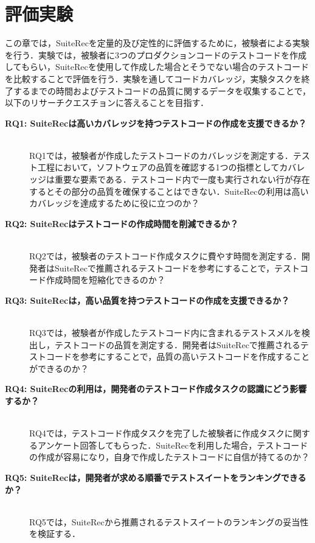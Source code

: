 \documentclass[12pt]{jarticle} %
\begin{document}
\section{評価実験}
この章では，SuiteRecを定量的及び定性的に評価するために，被験者による実験を行う．実験では，被験者に3つのプロダクションコードのテストコードを作成してもらい，SuiteRecを使用して作成した場合とそうでない場合のテストコードを比較することで評価を行う．実験を通してコードカバレッジ，実験タスクを終了するまでの時間およびテストコードの品質に関するデータを収集することで，以下のリサーチクエスチョンに答えることを目指す．

\begin{description}
\item[\textbf{RQ1: {\sf SuiteRec}は高いカバレッジを持つテストコードの作成を支援できるか？}]~\\
RQ1では，被験者が作成したテストコードのカバレッジを測定する．テスト工程において，ソフトウェアの品質を確認する1つの指標としてカバレッジは重要な要素である．テストコード内で一度も実行されない行が存在するとその部分の品質を確保することはできない．SuiteRecの利用は高いカバレッジを達成するために役に立つのか？
\item[\textbf{RQ2: {\sf SuiteRec}はテストコードの作成時間を削減できるか？}]~\\
RQ2では，被験者のテストコード作成タスクに費やす時間を測定する．開発者はSuiteRecで推薦されるテストコードを参考にすることで，テストコード作成時間を短縮化できるのか？
\item[\textbf{RQ3: {\sf SuiteRec}は，高い品質を持つテストコードの作成を支援できるか？}]~\\
RQ3では，被験者が作成したテストコード内に含まれるテストスメルを検出し，テストコードの品質を測定する．開発者はSuiteRecで推薦されるテストコードを参考にすることで，品質の高いテストコードを作成することができるのか？
\item[\textbf{RQ4: {\sf SuiteRec}の利用は，開発者のテストコード作成タスクの認識にどう影響するか？}]~\\
RQ4では，テストコード作成タスクを完了した被験者に作成タスクに関するアンケート回答してもらった．SuiteRecを利用した場合，テストコードの作成が容易になり，自身で作成したテストコードに自信が持てるのか？
\item[\textbf{RQ5: {\sf SuiteRec}は，開発者が求める順番でテストスイートをランキングできるか？}]~\\
RQ5では，SuiteRecから推薦されるテストスイートのランキングの妥当性を検証する．
\end{description}
\end{document}
